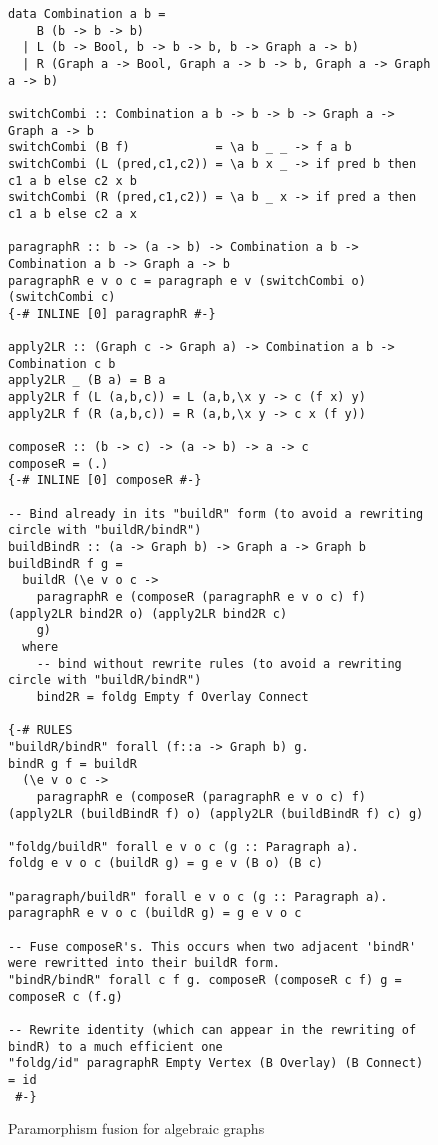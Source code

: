\begin{figure*}
\begin{verbatim}
data Combination a b =
    B (b -> b -> b)
  | L (b -> Bool, b -> b -> b, b -> Graph a -> b)
  | R (Graph a -> Bool, Graph a -> b -> b, Graph a -> Graph a -> b)

switchCombi :: Combination a b -> b -> b -> Graph a -> Graph a -> b
switchCombi (B f)            = \a b _ _ -> f a b
switchCombi (L (pred,c1,c2)) = \a b x _ -> if pred b then c1 a b else c2 x b
switchCombi (R (pred,c1,c2)) = \a b _ x -> if pred a then c1 a b else c2 a x
  
paragraphR :: b -> (a -> b) -> Combination a b -> Combination a b -> Graph a -> b
paragraphR e v o c = paragraph e v (switchCombi o) (switchCombi c)
{-# INLINE [0] paragraphR #-}

apply2LR :: (Graph c -> Graph a) -> Combination a b -> Combination c b
apply2LR _ (B a) = B a
apply2LR f (L (a,b,c)) = L (a,b,\x y -> c (f x) y)
apply2LR f (R (a,b,c)) = R (a,b,\x y -> c x (f y))

composeR :: (b -> c) -> (a -> b) -> a -> c
composeR = (.)
{-# INLINE [0] composeR #-}

-- Bind already in its "buildR" form (to avoid a rewriting circle with "buildR/bindR")
buildBindR :: (a -> Graph b) -> Graph a -> Graph b
buildBindR f g = 
  buildR (\e v o c -> 
    paragraphR e (composeR (paragraphR e v o c) f) (apply2LR bind2R o) (apply2LR bind2R c) 
    g)
  where
    -- bind without rewrite rules (to avoid a rewriting circle with "buildR/bindR")
    bind2R = foldg Empty f Overlay Connect
    
{-# RULES
"buildR/bindR" forall (f::a -> Graph b) g.
bindR g f = buildR 
  (\e v o c -> 
    paragraphR e (composeR (paragraphR e v o c) f) (apply2LR (buildBindR f) o) (apply2LR (buildBindR f) c) g)

"foldg/buildR" forall e v o c (g :: Paragraph a).
foldg e v o c (buildR g) = g e v (B o) (B c)

"paragraph/buildR" forall e v o c (g :: Paragraph a).
paragraphR e v o c (buildR g) = g e v o c

-- Fuse composeR's. This occurs when two adjacent 'bindR' were rewritted into their buildR form.
"bindR/bindR" forall c f g. composeR (composeR c f) g = composeR c (f.g)

-- Rewrite identity (which can appear in the rewriting of bindR) to a much efficient one
"foldg/id" paragraphR Empty Vertex (B Overlay) (B Connect) = id
 #-}
\end{verbatim}
\caption{Paramorphism fusion for algebraic graphs}
\label{fig:parafus}
\end{figure*}


